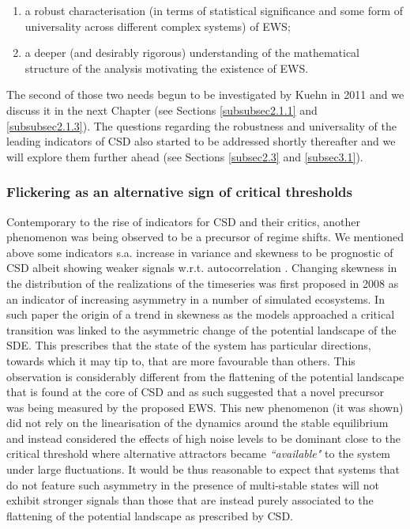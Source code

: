 \documentclass[../main.tex]{subfiles}
\begin{document}
\begin{enumerate}
     \item a robust characterisation (in terms of statistical significance and some form of universality across different complex systems) of EWS;
     \item a deeper (and desirably rigorous) understanding of the mathematical structure of the analysis motivating the existence of EWS.
\end{enumerate}
The second of those two needs begun to be investigated by Kuehn in 2011 \cite{Kuehn11} and we discuss it in the next Chapter (see Sections \ref{subsubsec2.1.1} and \ref{subsubsec2.1.3}). The questions regarding the robustness and universality of the leading indicators of CSD also started to be addressed shortly thereafter and we will explore them further ahead (see Sections \ref{subsec2.3} and \ref{subsec3.1}).
\subsubsection{Flickering as an alternative sign of critical thresholds}\label{subsubsec1.2.3}
Contemporary to the rise of indicators for CSD and their critics, another phenomenon was being observed to be a precursor of regime shifts. We mentioned above some indicators s.a. increase in variance and skewness to be prognostic of CSD albeit showing weaker signals w.r.t. autocorrelation \cite{Biggs09,Drake10,Carpenter11a}.
Changing skewness in the distribution of the realizations of the timeseries was first proposed in 2008 \cite{Guttal08} as an indicator of increasing asymmetry in a number of simulated ecosystems. 
In such paper the origin of a trend in skewness as the models approached a critical transition was linked to the asymmetric change of the potential landscape of the SDE.
This prescribes that the state of the system has particular directions, towards which it may tip to, that are more favourable than others.
This observation is considerably different from the flattening of the potential landscape that is found at the core of CSD and as such suggested that a novel precursor was being measured by the proposed EWS.
This new phenomenon (it was shown) did not rely on the linearisation of the dynamics around the stable equilibrium and instead considered the effects of high noise levels to be dominant close to the critical threshold where alternative attractors became \textit{``available"} to the system under large fluctuations.
It would be thus reasonable to expect that systems that do not feature such asymmetry in the presence of multi-stable states will not exhibit stronger signals than those that are instead purely associated to the flattening of the potential landscape as prescribed by CSD.
\end{document}
